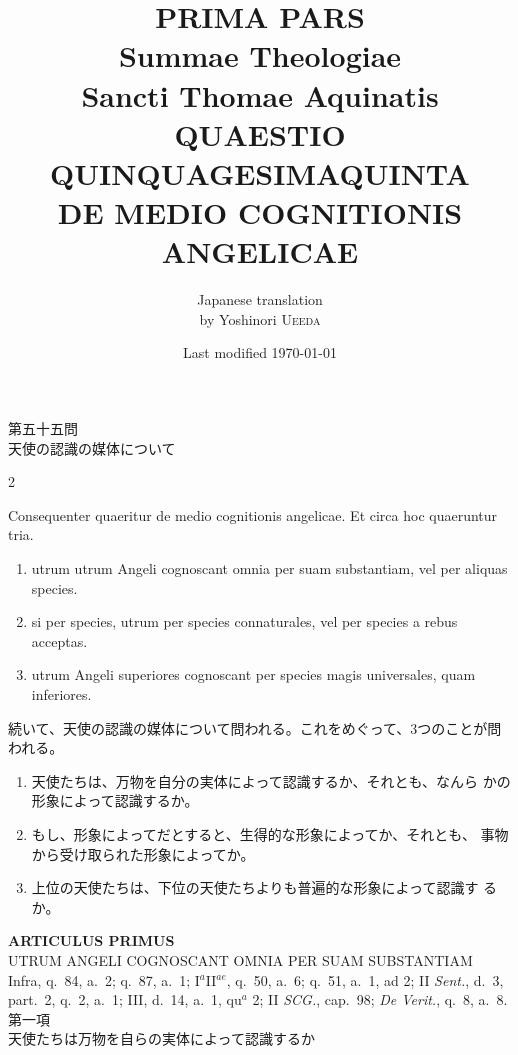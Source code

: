 \documentclass[paper=a4paper,fontsize=10pt,jafontsize=9pt,titlepage]{jlreq}
\title{{\bfseries PRIMA PARS}\\{\Huge Summae Theologiae}\\Sancti Thomae
Aquinatis\\{\sffamily QUAESTIO QUINQUAGESIMAQUINTA}\\DE MEDIO COGNITIONIS ANGELICAE}
\author{Japanese translation\\by Yoshinori {\scshape Ueeda}}
\date{Last modified \today}
\begin{document}
\maketitle
\pagestyle{fancy}

\begin{center}
{\Large 第五十五問\\天使の認識の媒体について}
\end{center}

\begin{paracol}{2}

Consequenter quaeritur de medio cognitionis angelicae. Et circa hoc
 quaeruntur tria. 
\begin{enumerate}
 \item utrum utrum Angeli cognoscant omnia per suam substantiam, vel per
       aliquas species.
 \item si per species, utrum per species connaturales, vel per species a
       rebus acceptas.
 \item utrum Angeli superiores cognoscant per species magis universales,
       quam inferiores.
\end{enumerate}

\switchcolumn

続いて、天使の認識の媒体について問われる。これをめぐって、3つのことが問
 われる。

\begin{enumerate}
 \item 天使たちは、万物を自分の実体によって認識するか、それとも、なんら
       かの形象によって認識するか。
 \item もし、形象によってだとすると、生得的な形象によってか、それとも、
       事物から受け取られた形象によってか。
 \item 上位の天使たちは、下位の天使たちよりも普遍的な形象によって認識す
       るか。
\end{enumerate}

\end{paracol}
\newpage
{}
{}
\setcounter{section}{1}
\setcounter{subsection}{0}



\begin{center}
 {\Large {\bfseries ARTICULUS PRIMUS}}\\
 {\large UTRUM ANGELI COGNOSCANT OMNIA PER SUAM SUBSTANTIAM}\\
 {\footnotesize Infra, q.~84, a.~2; q.~87, a.~1; I$^a$II$^{ae}$, q.~50,
 a.~6; q.~51, a.~1, ad 2; II {\itshape Sent.}, d.~3, part.~2, q.~2,
 a.~1; III, d.~14, a.~1, qu$^a$ 2; II {\itshape SCG.}, cap.~98;
 {\itshape De Verit.}, q.~8, a.~8.}\\
 {\Large 第一項\\天使たちは万物を自らの実体によって認識するか}
\end{center}
\end{document}
